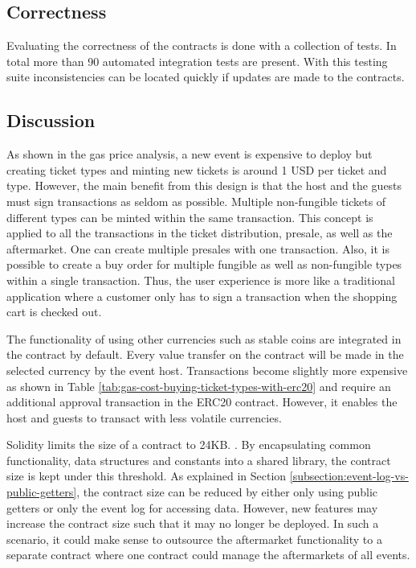 \subsection{Correctness}
Evaluating the correctness of the contracts is done with a collection of tests. In total more than 90 automated integration tests are present. With this testing suite inconsistencies can be located quickly if updates are made to the contracts. 

\subsection{Discussion}
As shown in the gas price analysis, a new event is expensive to deploy but creating ticket types and minting new tickets is around 1 USD per ticket and type. However, the main benefit from this design is that the host and the guests must sign transactions as seldom as possible. Multiple non-fungible tickets of different types can be minted within the same transaction. This concept is applied to all the transactions in the ticket distribution, presale, as well as the aftermarket. One can create multiple presales with one transaction. Also, it is possible to create a buy order for multiple fungible as well as non-fungible types within a single transaction. Thus, the user experience is more like a traditional application where a customer only has to sign a transaction when the shopping cart is checked out.

The functionality of using other currencies such as stable coins are integrated in the contract by default. Every value transfer on the contract will be made in the selected currency by the event host. Transactions become slightly more expensive as shown in Table \ref{tab:gas-cost-buying-ticket-types-with-erc20} and require an additional approval transaction in the ERC20 contract. However, it enables the host and guests to transact with less volatile currencies. 

Solidity limits the size of a contract to 24KB. \cite{solidity-contract-size}. By encapsulating common functionality, data structures and constants into a shared library, the contract size is kept under this threshold. As explained in Section \ref{subsection:event-log-vs-public-getters}, the contract size can be reduced by either only using public getters or only the event log for accessing data. However, new features may increase the contract size such that it may no longer be deployed. In such a scenario, it could make sense to outsource the aftermarket functionality to a separate contract where one contract could manage the aftermarkets of all events.

